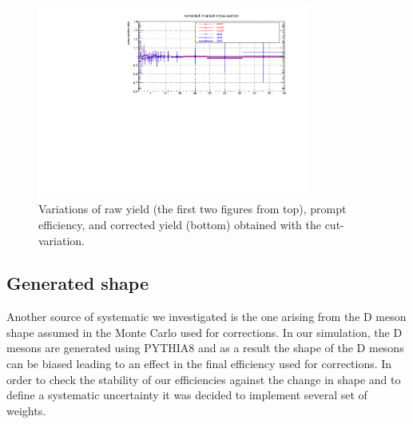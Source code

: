 \begin{figure}[tb]
\begin{center}
 \includegraphics[width=0.8\textwidth]{figures/Dstar/pp13TeV/corrected-yield-ratio-cut-var-v2.pdf}
\caption{Variations of raw yield (the first two figures from top), prompt  efficiency, and corrected yield (bottom) obtained with the cut-variation.}
\label{fig:DstarCutVar010}
\end{center}
\end{figure}


\clearpage
\subsection{Generated \pt shape}
\label{sec:gen_pt_syst}
Another source of systematic we investigated is the one arising from the D meson \pt shape assumed in the Monte Carlo used for corrections. In our simulation, the D mesons are generated using PYTHIA8 and as a result the \pt shape of the D mesons can be biased leading to an effect in the final efficiency used for corrections. In order to check the stability of our efficiencies against the change in \pt shape and to define a systematic uncertainty it was decided to implement several set of weights. 




